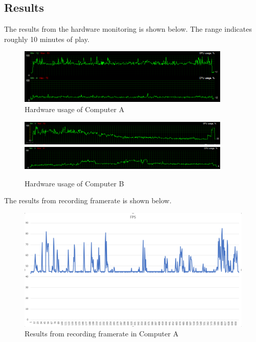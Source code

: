 \documentclass[paper=a4, fontsize=11pt]{scrartcl} %
\numberwithin{equation}{section} %
\numberwithin{figure}{section} %
\numberwithin{table}{section} %
\begin{document}
\subsection{Results}
The results from the hardware monitoring is shown below. The range indicates roughly 10 minutes of play. 

\begin{figure}[H]
\centering
\includegraphics[width=0.9\textwidth]{B_usage.PNG}
\caption{Hardware usage of Computer A}
\end{figure}

\begin{figure}[H]
\centering
\includegraphics[width=0.9\textwidth]{C_gpu.PNG}
\includegraphics[width=0.9\textwidth]{C_cpu.PNG}
\caption{Hardware usage of Computer B}
\end{figure}

The results from recording framerate is shown below.

\begin{figure}[H]
\centering
\includegraphics[scale=1]{A_fps.PNG}
\caption{Results from recording framerate in Computer A}
\end{figure}
\end{document}
